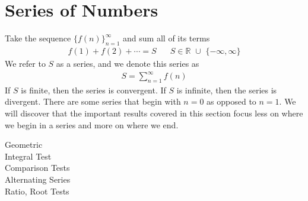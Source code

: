 \section{Series of Numbers}

\begin{definition}
Take the sequence $\{f(n)\}_{n=1}^{\infty}$ and sum all of its terms
\begin{align*}
    f(1) + f(2) + \cdots = S \hspace{20pt} S \in \mathbb{R} \hspace{4pt} \cup \hspace{4pt} \{-\infty, \infty\}
\end{align*}
We refer to $S$ as a series, and we denote this series as 
\begin{align*}
    S = \sum_{n=1}^{\infty} f(n)
\end{align*}
If $S$ is finite, then the series is convergent. If $S$ is infinite, then the series is divergent. There are some series that begin with $n=0$ as opposed to $n=1$. We will discover that the important results covered in this section focus less on where we begin in a series and more on where we end.
\end{definition}
Geometric\\
Integral Test\\
Comparison Tests\\
Alternating Series\\
Ratio, Root Tests\\

